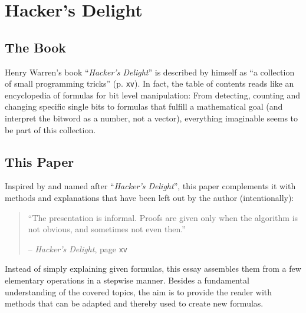 \section{Hacker's Delight}\label{sec:book}
\subsection*{The Book}
Henry Warren's book ``\emph{Hacker's Delight}'' is described by himself as ``a collection of small programming tricks'' \cite{Warren:2012:HD:2462741} (p. \texttt{xv}).
In fact, the table of contents reads like an encyclopedia of formulas for bit level manipulation:
From detecting, counting and changing specific single bits to formulas that fulfill a mathematical goal (and interpret the bitword as a number, not a vector), everything imaginable seems to be part of this collection.

\subsection*{This Paper}
Inspired by and named after ``\emph{Hacker's Delight}'',
this paper complements it with methods and explanations that have been left out by the author (intentionally):

\begin{quote}
``The presentation is informal. Proofs are given only when the algorithm is not obvious, and sometimes not even then.''

\hfill -- \emph{Hacker's Delight}, page \texttt{xv} \cite{Warren:2012:HD:2462741}
\end{quote}

\noindent
Instead of simply explaining given formulas,
this essay assembles them from a few elementary operations in a stepwise manner.
Besides a fundamental understanding of the covered topics,
the aim is to provide the reader with methods that can be adapted and thereby used to create new formulas.
